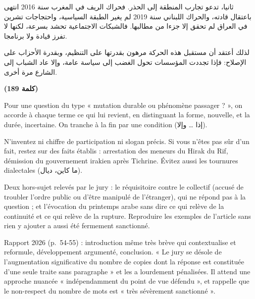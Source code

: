 \documentclass[11pt,a4paper]{article}
\begin{document}
ثانيا، تدعو تجارب المنطقة إلى الحذر. فحراك الريف في المغرب سنة 2016 انتهى باعتقال قادته، والحراك اللبناني سنة 2019 لم يغير الطبقة السياسية، واحتجاجات تشرين في العراق لم تحقق إلا جزءا من مطالبها. فالشبكات الاجتماعية تحشد بسرعة، لكنها لا تفرز قيادة ولا برنامجا.

لذلك أعتقد أن مستقبل هذه الحركة مرهون بقدرتها على التنظيم، وبقدرة الأحزاب على الإصلاح: فإذا تجددت المؤسسات تحول الغضب إلى سياسة عامة، وإلا عاد الشباب إلى الشارع مرة أخرى.

\textbf{(189 كلمة)}

\begin{methode}

Pour une question du type « mutation durable ou phénomène passager ? », on accorde à chaque terme ce qui lui revient, en distinguant la forme, nouvelle, et la durée, incertaine. On tranche à la fin par une condition (إذا \ldots{} وإلا).

\end{methode}

\begin{piege}

N'inventez ni chiffre de participation ni slogan précis. Si vous n'êtes pas sûr d'un fait, restez sur des faits établis : arrestation des meneurs du Hirak du Rif, démission du gouvernement irakien après Tichrine. Évitez aussi les tournures dialectales (ما كاين، ديال).

\end{piege}

\begin{piege}

Deux hors-sujet relevés par le jury : le réquisitoire contre le collectif (accusé de troubler l'ordre public ou d'être manipulé de l'étranger), qui ne répond pas à la question ; et l'évocation du printemps arabe sans dire ce qui relève de la continuité et ce qui relève de la rupture. Reproduire les exemples de l'article sans rien y ajouter a aussi été fermement sanctionné.

\end{piege}

\begin{jury}

Rapport 2026 (p.~54-55) : introduction même très brève qui contextualise et reformule, développement argumenté, conclusion. « Le jury se désole de l'augmentation significative du nombre de copies dont la réponse est constituée d'une seule traite sans paragraphe » et les a lourdement pénalisées. Il attend une approche nuancée « indépendamment du point de vue défendu », et rappelle que le non-respect du nombre de mots est « très sévèrement sanctionné ».

\end{jury}
\end{document}
